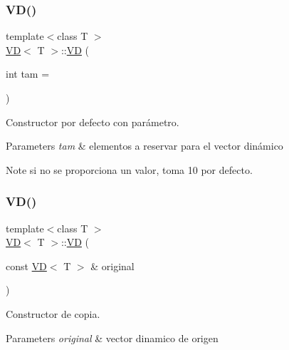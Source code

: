 \subsubsection{\texorpdfstring{V\+D()}{VD()}\hspace{0.1cm}{\footnotesize\ttfamily [1/2]}}
{\footnotesize\ttfamily template$<$class T $>$ \\
\mbox{\hyperlink{class_v_d}{VD}}$<$ T $>$\+::\mbox{\hyperlink{class_v_d}{VD}} (\begin{DoxyParamCaption}\item[{int}]{tam = {} }\end{DoxyParamCaption})}



Constructor por defecto con parámetro. 


\begin{DoxyParams}{Parameters}
{\em tam} & elementos a reservar para el vector dinámico \\
\hline
\end{DoxyParams}
\begin{DoxyNote}{Note}
si no se proporciona un valor, toma 10 por defecto. 
\end{DoxyNote}
\mbox{\label{class_v_d_a4f22b92dd8ace25d50311ccd61508dfc}} 
\subsubsection{\texorpdfstring{V\+D()}{VD()}\hspace{0.1cm}{\footnotesize\ttfamily [2/2]}}
{\footnotesize\ttfamily template$<$class T $>$ \\
\mbox{\hyperlink{class_v_d}{VD}}$<$ T $>$\+::\mbox{\hyperlink{class_v_d}{VD}} (\begin{DoxyParamCaption}\item[{const \mbox{\hyperlink{class_v_d}{VD}}$<$ T $>$ \&}]{original }\end{DoxyParamCaption})}



Constructor de copia. 


\begin{DoxyParams}{Parameters}
{\em original} & vector dinamico de origen \\
\hline
\end{DoxyParams}
\mbox{\label{class_v_d_a0533f99aa2fee31fde63edd6c4b8bb2d}} 
